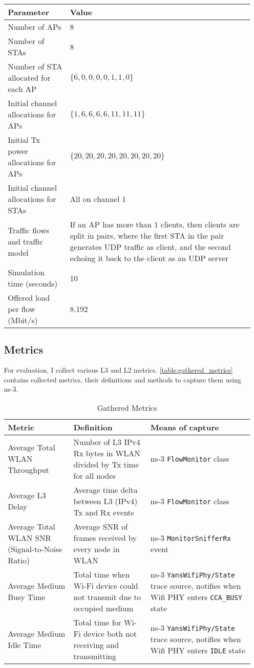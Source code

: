 \begin{longtable}{|p{6cm}|p{7cm}|}
\textbf{Parameter} & \textbf{Value} \\ \hline
Number of APs & 8 \\ \hline
Number of STAs & 8 \\ \hline
Number of STA allocated for each AP & $\{6, 0, 0, 0, 0, 1, 1, 0\}$ \\ \hline
Initial channel allocations for APs  & $\{1, 6, 6, 6, 6, 11, 11, 11\}$ \\ \hline
Initial Tx power allocations for APs  & $\{20, 20, 20, 20, 20, 20, 20, 20\}$ \\ \hline
Initial channel allocations for STAs &  All on channel 1 \\ \hline
Traffic flows and traffic model  & If an AP has more than 1 clients, then clients are split in pairs, where the first STA in the pair generates UDP traffic as client, and the second echoing it back to the client as an UDP server \\ \hline
Simulation time (seconds) & 10 \\ \hline
Offered load per flow (Mbit/s) & 8.192 \\ \hline
\end{longtable}

\subsection{Metrics}
For evaluation, I collect various L3 and L2 metrics. \autoref{table:gathered_metrics} contains collected metrics, their definitions and methods to capture them using ns-3.

\begin{longtable}{|p{5cm}|p{5cm}|p{5cm}|}
\caption{Gathered Metrics}
\label{table:gathered_metrics} \\
\hline
\textbf{Metric} & \textbf{Definition} & \textbf{Means of capture}\\ \hline
Average Total WLAN Throughput & Number of L3 IPv4 Rx bytes in WLAN divided by Tx time for all nodes & ns-3 \texttt{FlowMonitor} class \\
\hline
Average L3 Delay & Average time delta between L3 (IPv4) Tx and Rx events & ns-3 \texttt{FlowMonitor} class \\
\hline
Average Total WLAN SNR (Signal-to-Noise Ratio) & Average SNR of frames received by every node in WLAN & ns-3 \texttt{MonitorSnifferRx} event \\
\hline
Average Medium Busy Time & Total time when Wi-Fi device could not transmit due to occupied medium & ns-3 \texttt{YansWifiPhy/State} trace source, notifies when Wifi PHY enters \texttt{CCA\_BUSY} state \\
\hline
Average Medium Idle Time & Total time for Wi-Fi device both not receiving and transmitting & ns-3 \texttt{YansWifiPhy/State} trace source, notifies when Wifi PHY enters \texttt{IDLE} state\\
\hline
\end{longtable}



